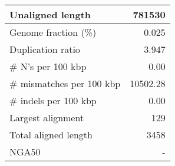 \documentclass[12pt,a4paper]{article}
\begin{document}
\begin{table}[ht]
\begin{center}
\begin{tabular}{|l*{1}{|r}|}
Unaligned length & 781530 \\ \hline
Genome fraction (\%) & 0.025 \\ \hline
Duplication ratio & 3.947 \\ \hline
\# N's per 100 kbp & 0.00 \\ \hline
\# mismatches per 100 kbp & 10502.28 \\ \hline
\# indels per 100 kbp & 0.00 \\ \hline
Largest alignment & 129 \\ \hline
Total aligned length & 3458 \\ \hline
NGA50 & - \\ \hline
\end{tabular}
\end{center}
\end{table}
\end{document}
